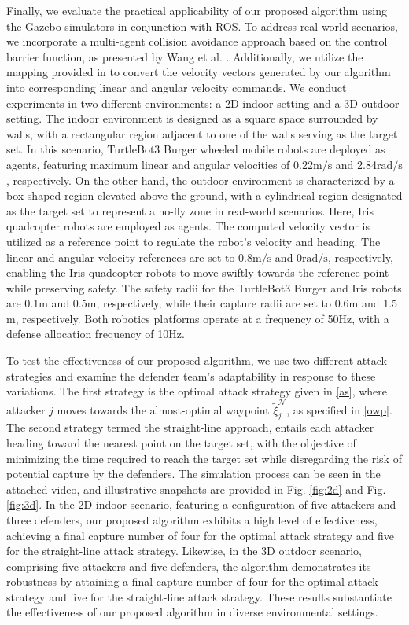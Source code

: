 \documentclass[journal]{IEEEtran}
\newcommand{\N}{\mathcal{N}}
\newcommand{\1}{\mathbf{1}}
\begin{document}
Finally, we evaluate the practical applicability of our proposed algorithm using the Gazebo simulators in conjunction with ROS. To address real-world scenarios, we incorporate a multi-agent collision avoidance approach based on the control barrier function, as presented by Wang et al. \cite{wang2017safety}. Additionally, we utilize the mapping provided in \cite{lee2015multirobot} to convert the velocity vectors generated by our algorithm into corresponding linear and angular velocity commands. We conduct experiments in two different environments: a 2D indoor setting and a 3D outdoor setting. The indoor environment is designed as a square space surrounded by walls, with a rectangular region adjacent to one of the walls serving as the target set. In this scenario, TurtleBot3 Burger wheeled mobile robots are deployed as agents, featuring maximum linear and angular velocities of 0.22$\text{m/s}$ and 2.84$\text{rad/s}$, respectively. On the other hand, the outdoor environment is characterized by a box-shaped region elevated above the ground, with a cylindrical region designated as the target set to represent a no-fly zone in real-world scenarios. Here, Iris quadcopter robots are employed as agents. The computed velocity vector is utilized as a reference point to regulate the robot's velocity and heading. The linear and angular velocity references are set to 0.8$\text{m/s}$ and 0$\text{rad/s}$, respectively, enabling the Iris quadcopter robots to move swiftly towards the reference point while preserving safety. The safety radii for the TurtleBot3 Burger and Iris robots are 0.1$\text{m}$ and 0.5$\text{m}$, respectively, while their capture radii are set to 0.6$\text{m}$ and 1.5$\text{m}$, respectively. Both robotics platforms operate at a frequency of 50$\text{Hz}$, with a defense allocation frequency of 10$\text{Hz}$.

To test the effectiveness of our proposed algorithm, we use two different attack strategies and examine the defender team's adaptability in response to these variations. The first strategy is the optimal attack strategy given in \eqref{as}, where attacker $j$ moves towards the almost-optimal waypoint $\tilde{\xi}^{\N}_j$, as specified in \eqref{owp}. The second strategy termed the straight-line approach, entails each attacker heading toward the nearest point on the target set, with the objective of minimizing the time required to reach the target set while disregarding the risk of potential capture by the defenders. The simulation process can be seen in the attached video, and illustrative snapshots are provided in Fig. \ref{fig:2d} and Fig. \ref{fig:3d}. In the 2D indoor scenario, featuring a configuration of five attackers and three defenders, our proposed algorithm exhibits a high level of effectiveness, achieving a final capture number of four for the optimal attack strategy and five for the straight-line attack strategy. Likewise, in the 3D outdoor scenario, comprising five attackers and five defenders, the algorithm demonstrates its robustness by attaining a final capture number of four for the optimal attack strategy and five for the straight-line attack strategy. These results substantiate the effectiveness of our proposed algorithm in diverse environmental settings.
\end{document}
